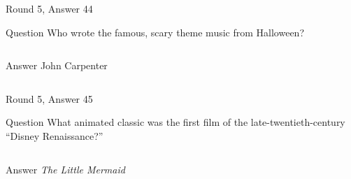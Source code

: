 \documentclass[11pt]{beamer}
\begin{document}
\begin{frame}[t]{Round 5, Answer 44}
\vspace{2em}
\begin{block}{Question}
Who wrote the famous, scary theme music from Halloween?
\end{block}
\pause{}
\begin{columns}[T,totalwidth=\linewidth]
\begin{column}{0.35\linewidth}
\begin{block}{Answer}
John Carpenter
\end{block}
\end{column}
\begin{column}{0.6\linewidth}
\begin{center}
\texttt{[image: \{Images/halloween]}.jpg}
\end{center}
\end{column}
\end{columns}
\end{frame}
    

\begin{frame}[t]{Round 5, Answer 45}
\vspace{2em}
\begin{block}{Question}
What animated classic was the first film of the late-twentieth-century ``Disney Renaissance?''
\end{block}
\pause{}
\begin{columns}[T,totalwidth=\linewidth]
\begin{column}{0.35\linewidth}
\begin{block}{Answer}
\emph{The Little Mermaid}
\end{block}
\end{column}
\begin{column}{0.6\linewidth}
\begin{center}
\texttt{[image: \{Images/littlemermaid]}.png}
\end{center}
\end{column}
\end{columns}
\end{frame}
    
\end{document}
